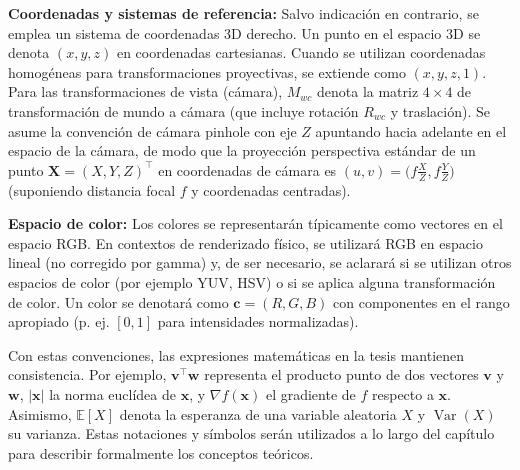 \textbf{Coordenadas y sistemas de referencia:} Salvo indicación en contrario, se emplea un sistema de coordenadas 3D derecho. 
Un punto en el espacio 3D se denota $(x, y, z)$ en coordenadas cartesianas. Cuando se utilizan coordenadas homogéneas para transformaciones proyectivas, 
se extiende como $(x, y, z, 1)$. Para las transformaciones de vista (cámara), $M_{wc}$ denota la matriz $4\times 4$ de transformación de mundo a cámara 
(que incluye rotación $R_{wc}$ y traslación). Se asume la convención de cámara pinhole con eje $Z$ apuntando hacia adelante en el espacio de la cámara, 
de modo que la proyección perspectiva estándar de un punto $\mathbf{X} = (X, Y, Z)^\top$ en coordenadas de cámara es 
$(u, v) = \big(f \frac{X}{Z}, f \frac{Y}{Z}\big)$ (suponiendo distancia focal $f$ y coordenadas centradas).

\textbf{Espacio de color:} Los colores se representarán típicamente como vectores en el espacio RGB. En contextos de renderizado físico, 
se utilizará RGB en espacio lineal (no corregido por gamma) y, de ser necesario, se aclarará si se utilizan otros espacios de color (por ejemplo YUV, HSV) 
o si se aplica alguna transformación de color. Un color se denotará como $\mathbf{c} = (R, G, B)$ con componentes en el rango apropiado (p. ej. $[0,1]$ 
para intensidades normalizadas).

Con estas convenciones, las expresiones matemáticas en la tesis mantienen consistencia. Por ejemplo, $\mathbf{v}^\top \mathbf{w}$ representa el 
producto punto de dos vectores $\mathbf{v}$ y $\mathbf{w}$, $| \mathbf{x} |$ la norma euclídea de $\mathbf{x}$, y $\nabla f(\mathbf{x})$ el gradiente 
de $f$ respecto a $\mathbf{x}$. Asimismo, $\mathbb{E}[X]$ denota la esperanza de una variable aleatoria $X$ y $\operatorname{Var}(X)$ su varianza. 
Estas notaciones y símbolos serán utilizados a lo largo del capítulo para describir formalmente los conceptos teóricos.

